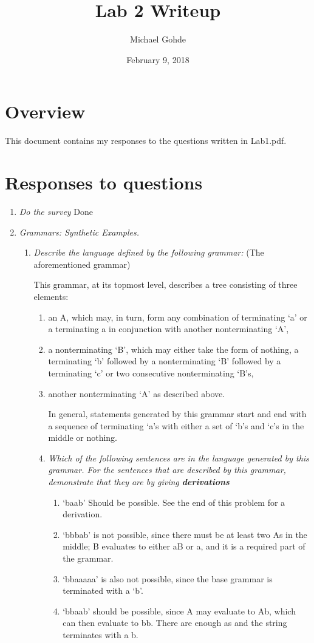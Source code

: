 \documentclass[12pt,letterpaper]{article}
\begin{document}
\title{Lab 2 Writeup}
\author{Michael Gohde}
\date{February 9, 2018}
\maketitle

\section{Overview}
This document contains my responses to the questions written in Lab1.pdf.

\section{Responses to questions}
\begin{enumerate}
\item \textit{Do the survey}
Done

\item \textit{Grammars: Synthetic Examples.}
\begin{enumerate}
    \item \textit{Describe the language defined by the following grammar:}
    (The aforementioned grammar)
    
    This grammar, at its topmost level, describes a tree consisting of three elements: 
    \begin{enumerate}
    \item an A, which may, in turn, form any combination of terminating `a' or a terminating a in conjunction with another nonterminating `A', 
    \item a nonterminating `B', which may either take the form of nothing, a terminating `b' followed by a nonterminating `B' followed by a terminating `c' or two consecutive nonterminating `B's, 
    \item another nonterminating `A' as described above.
    
    In general, statements generated by this grammar start and end with a sequence of terminating `a's with either a set of `b's and `c's in the middle or nothing.
    
    \item \textit{Which of the following sentences are in the language generated by this grammar. For the sentences that are described by this grammar, demonstrate that they are by giving \textbf{derivations}}
    
    \begin{enumerate}
    \item `baab' Should be possible. See the end of this problem for a derivation.
    \item `bbbab' is not possible, since there must be at least two As in the middle; B evaluates to either aB or a, and it is a required part of the grammar.
    \item `bbaaaaa' is also not possible, since the base grammar is terminated with a `b'.
    \item `bbaab' should be possible, since A may evaluate to Ab, which can then evaluate to bb. There are enough as and the string terminates with a b.
    \end{enumerate}
    

\end{enumerate}
\end{enumerate}
\end{enumerate}
\end{document}
